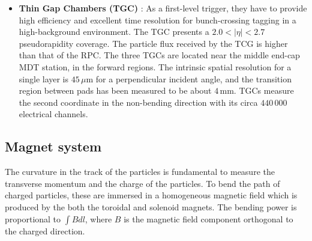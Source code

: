 \begin{itemize}
	\item \textbf{Thin Gap Chambers (TGC)} \cite{Nagai:1996mf}: As a first-level trigger, they have to 
		provide high efficiency and excellent time resolution for bunch-crossing tagging in a 
		high-background environment. The TGC presents a $2.0 < |\eta| < 2.7$ pseudorapidity 
		coverage. The particle flux received by the TCG is higher than that of the RPC.
		The three TGCs are located near the middle end-cap MDT station, in the forward regions.
		The intrinsic spatial resolution for a single layer is $45\, \mu$m for a perpendicular incident angle, 
		and the transition region between pads has been measured to be about $4\,$mm.
		TGCs measure the second coordinate in the non-bending direction with its circa $440\,000$ electrical channels.
\end{itemize}
 



\subsection{Magnet system}
\label{sec:Chap2:MagnetSystem}

 
The curvature in the track of the particles is fundamental to measure the transverse momentum and the charge of the particles.
To bend the path of charged particles, these are immersed in a homogeneous magnetic field which is produced by the 
both the toroidal and solenoid magnets.
The bending power is proportional to $\int B dl$, where $B$ is the magnetic field component orthogonal to the charged direction.


